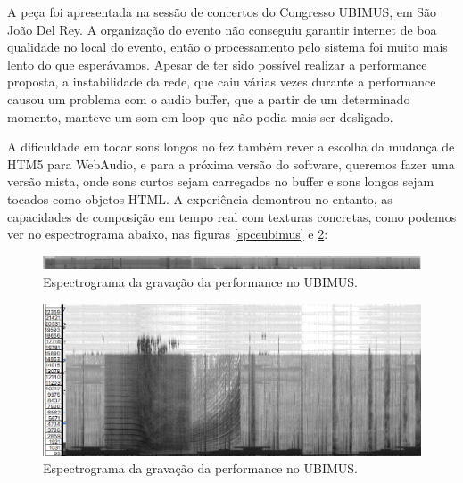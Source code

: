 A peça foi apresentada na sessão de concertos do Congresso UBIMUS, em São João Del Rey. A organização do evento não conseguiu garantir internet de boa qualidade no local do evento, então o processamento pelo sistema foi muito mais lento do que esperávamos. Apesar de ter sido possível realizar a performance proposta, a instabilidade da rede, que caiu várias vezes durante a performance causou um problema com o audio buffer, que a partir de um determinado momento, manteve um som em loop que não podia mais ser desligado.

A dificuldade em tocar sons longos no fez também rever a escolha da mudança de HTM5 para WebAudio, e para a próxima versão do software, queremos fazer uma versão mista, onde sons curtos sejam carregados no buffer e sons longos sejam tocados como objetos HTML. A experiência demontrou no entanto, as capacidades de composição em tempo real com texturas concretas, como podemos ver no espectrograma abaixo, nas figuras \ref{spceubimus} e \ref{spceubimusdt}:

\begin{figure}

\includegraphics[width=1\linewidth]{pictures/cap4/canibalspec2}
\caption{Espectrograma da gravação da performance no UBIMUS.}
\label{specubimus}
\end{figure}

\begin{figure}

\includegraphics[width=1\linewidth]{pictures/cap4/canibalspecdbvdt}
\caption{Espectrograma da gravação da performance no UBIMUS.}
\label{spceubimusdt}
\end{figure}

